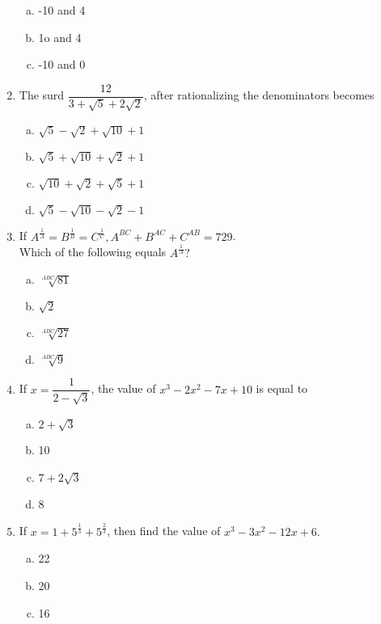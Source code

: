 \begin{multicols}{2}
\begin{enumerate}
\begin{multicols}{2}
\begin{enumerate}[(a)]
\item -10 and 4
\item 1o and 4
\item -10 and 0
\end{enumerate}
\end{multicols}
\item The surd $\dfrac{12}{3+\sqrt{5}+2\sqrt{2}}$, after rationalizing the denominators becomes
\begin{multicols}{2}
\begin{enumerate}[(a)]
\item $\sqrt{5}-\sqrt{2}+\sqrt{10}+1$
\item $\sqrt{5}+\sqrt{10}+\sqrt{2}+1$
\item $\sqrt{10}+\sqrt{2}+\sqrt{5}+1$
\item $\sqrt{5}-\sqrt{10}-\sqrt{2}-1$
\end{enumerate}
\end{multicols}
\item If $A^\frac{1}{A} = B^\frac{1}{B} = C^\frac{1}{C}, A^{BC}+B^{AC}+C^{AB} = 729 $.\\
Which of the following equals $A^\frac{1}{A} ?$ 
\begin{multicols}{2}
\begin{enumerate}[(a)]
\item $\sqrt[ABC]{81}$
\item $\sqrt{2}$
\item $\sqrt[ABC]{27}$
\item $\sqrt[ABC]{9}$
\end{enumerate}
\end{multicols}
\item If $x = \dfrac{1}{2-\sqrt{3}}$, the value of $x^3-2x^2-7x+10$ is equal to
\begin{multicols}{2}
\begin{enumerate}[(a)]
\item $2+\sqrt{3}$
\item 10
\item  $7+2\sqrt{3}$
\item 8
\end{enumerate}
\end{multicols}
\item If $x = 1+5^{\frac{1}{3}}+5^{\frac{2}{3}}$, then find the value of $x^3-3x^2-12x+6.$
\begin{multicols}{2}
\begin{enumerate}[(a)]
\item 22
\item 20
\item 16

\end{enumerate}
\end{multicols}
\end{enumerate}
\end{multicols}
